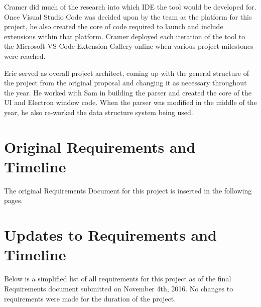 \documentclass[letterpaper,10pt,titlepage,draftclsnofoot,onecolumn,onesided] {IEEEtran}
\begin{document}
Cramer did much of the research into which IDE the tool would be developed for. 
Once Visual Studio Code was decided upon by the team as the platform for this project, he also created the core of code required to launch and include extensions within that platform. 
Cramer deployed each iteration of the tool to the Microsoft VS Code Extension Gallery online when various project milestones were reached.

Eric served as overall project architect, coming up with the general structure of the project from the original proposal and changing it as necessary throughout the year. 
He worked with Sam in building the parser and created the core of the UI and Electron window code. 
When the parser was modified in the middle of the year, he also re-worked the data structure system being used. \\


\section{Original Requirements and Timeline}
The original Requirements Document for this project is inserted in the following pages.

\pagebreak
\section{Updates to Requirements and Timeline}
Below is a simplified list of all requirements for this project as of the final Requirements document submitted on November 4th, 2016. 
No changes to requirements were made for the duration of the project.
\end{document}
